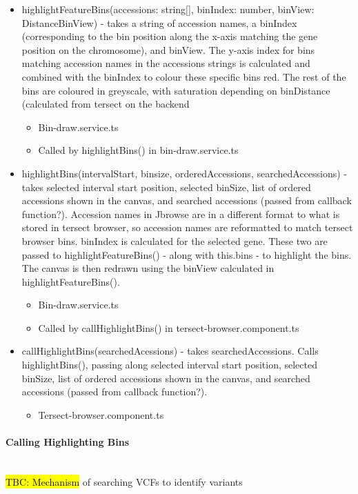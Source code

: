 \documentclass[12pt]{article}
\begin{document}
\begin{itemize}
    \item highlightFeatureBins(accessions: string[], binIndex: number, binView: DistanceBinView) - takes a string of accession names, a binIndex (corresponding to the bin position along the x-axis matching the gene position on the chromosome), and binView. The y-axis index for bins matching accession names in the accessions strings is calculated and combined with the binIndex to colour these specific bins red. The rest of the bins are coloured in greyscale, with saturation depending on binDistance (calculated from tersect on the backend 
    \begin{itemize}
        \item Bin-draw.service.ts 
        \item Called by highlightBins() in bin-draw.service.ts 
    \end{itemize}
    \item highlightBins(intervalStart, binsize, orderedAccessions, searchedAccessions) - takes selected interval start position, selected binSize, list of ordered accessions shown in the canvas, and searched accessions (passed from callback function?). Accession names in Jbrowse are in a different format to what is stored in tersect browser, so accession names are reformatted to match tersect browser bins. binIndex is calculated for the selected gene. These two are passed to highlightFeatureBins() - along with this.bins - to highlight the bins. The canvas is then redrawn using the binView calculated in highlightFeatureBins(). 
    \begin{itemize}
        \item Bin-draw.service.ts 
        \item Called by callHighlightBins() in tersect-browser.component.ts 
    \end{itemize}
    \item callHighlightBins(searchedAcessions) - takes searchedAccessions. Calls highlightBins(), passing along  selected interval start position, selected binSize, list of ordered accessions shown in the canvas, and searched accessions (passed from callback function?). 
    \begin{itemize}
        \item Tersect-browser.component.ts 
    \end{itemize}
\end{itemize}

\paragraph{Calling Highlighting Bins} \mbox{}
\\
\hl{TBC: Mechanism} of searching VCFs to identify variants 
\end{document}
